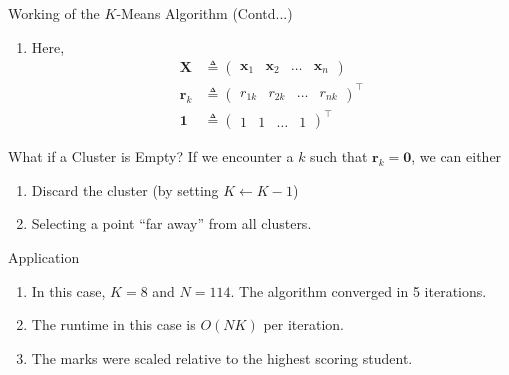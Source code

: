 \documentclass{beamer}
\providecommand{\brak}[1]{\ensuremath{\left(#1\right)}}
\theoremstyle{remark}
\newcommand{\myvec}[1]{\ensuremath{\begin{pmatrix}#1\end{pmatrix}}}
\renewcommand{\vec}[1]{\mathbf{\boldsymbol{#1}}}
\newcounter{saveenumi}
\newcommand{\conti}{\setcounter{enumi}{\value{saveenumi}}}
\begin{document}
\begin{frame}{Working of the $K$-Means Algorithm (Contd...)}
    \begin{enumerate}
        \conti
        \item Here,
            \begin{align}
                \vec{X} &\triangleq \myvec{\vec{x}_1&\vec{x}_2&\ldots&\vec{x}_n} \\
                \vec{r}_k &\triangleq \myvec{r_{1k}&r_{2k}&\ldots&r_{nk}}^\top \\
                \vec{1} &\triangleq \myvec{1&1&\ldots&1}^\top
                \label{eq:M-defs}
            \end{align}
    \end{enumerate}
    \begin{alertblock}{What if a Cluster is Empty?}
        If we encounter a $k$ such that $\vec{r}_{k} = \vec{0}$, we can either
        \pause
        \begin{enumerate}
            \item Discard the cluster (by setting $K \leftarrow K - 1$)
            \pause
            \item Selecting a point ``far away'' from all clusters.
        \end{enumerate}
    \end{alertblock}
\end{frame}

\begin{frame}{Application}
    \pause
    \begin{enumerate}
        \item In this case, $K = 8$ and $N = 114$. The algorithm converged in 5 iterations.
        \pause
        \item The runtime in this case is $O\brak{NK}$ per iteration.
        \pause
        \item The marks were scaled relative to the highest scoring student.    
    \end{enumerate}
\end{frame}
\end{document}
